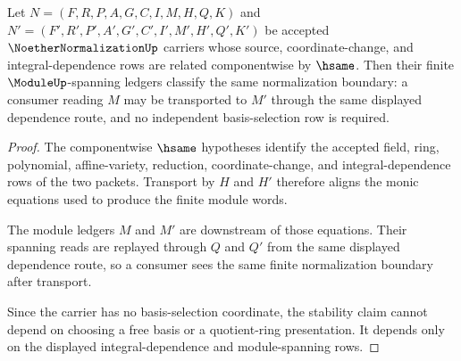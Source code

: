 \begin{theorem}
\label{thm:noether-normalization-finite-module-stability}
Let $N=(F,R,P,A,G,C,I,M,H,Q,K)$ and $N'=(F',R',P',A',G',C',I',M',H',Q',K')$ be accepted $\NoetherNormalizationUp$ carriers whose source, coordinate-change, and integral-dependence rows are related componentwise by $\hsame$. Then their finite $\ModuleUp$-spanning ledgers classify the same normalization boundary: a consumer reading $M$ may be transported to $M'$ through the same displayed dependence route, and no independent basis-selection row is required.
\end{theorem}
\begin{proof}
The componentwise $\hsame$ hypotheses identify the accepted field, ring, polynomial, affine-variety, reduction, coordinate-change, and integral-dependence rows of the two packets. Transport by $H$ and $H'$ therefore aligns the monic equations used to produce the finite module words.

The module ledgers $M$ and $M'$ are downstream of those equations. Their spanning reads are replayed through $Q$ and $Q'$ from the same displayed dependence route, so a consumer sees the same finite normalization boundary after transport.

Since the carrier has no basis-selection coordinate, the stability claim cannot depend on choosing a free basis or a quotient-ring presentation. It depends only on the displayed integral-dependence and module-spanning rows.
\end{proof}




